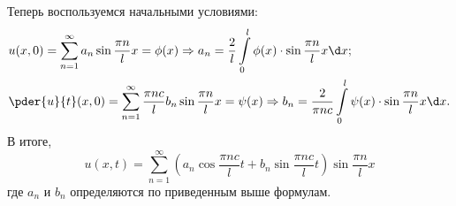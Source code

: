 Теперь воспользуемся начальными условиями:
\begin{align*}
	& u(x, 0) = \sum_{n=1}^{\infty} a_n\sin\frac{\pi n}{l}x = \phi(x)
	\Rightarrow a_n = \frac{2}{l} \int\limits_0^l \phi(x)\cdot
	\sin\frac{\pi n}{l}x\d x; \\
	& \pder{u}{t}(x, 0) = \sum_{n=1}^{\infty} \frac{\pi nc}{l}
	b_n\sin\frac{\pi n}{l}x = \psi(x) \Rightarrow b_n = \frac{2}{\pi nc}
	\int\limits_0^l \psi(x)\cdot\sin\frac{\pi n}{l}x\d x.
\end{align*}
В итоге, 
\[
	u(x, t) = \sum_{n=1}^{\infty}\left( a_n\cos\frac{\pi nc}{l}t + 
	b_n\sin\frac{\pi nc}{l}t \right)\sin\frac{\pi n}{l}x
\]
где \( a_n \) и \( b_n \) определяются по приведенным выше формулам.

\newpage

